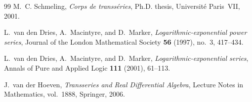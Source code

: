 \documentclass[11pt,openany]{book}
\theoremstyle{definition}
\theoremstyle{plain}
\theoremstyle{remark}
\begin{document}
\begin{thebibliography}{99}
M.~C. Schmeling,
\emph{Corps de transs\'eries},
Ph.D. thesis, Universit\'e Paris~VII, 2001.

L.~van den Dries, A.~Macintyre, and D.~Marker,
\emph{Logarithmic-exponential power series},
Journal of the London Mathematical Society \textbf{56} (1997), no.~3,
417--434.

L.~van den Dries, A.~Macintyre, and D.~Marker,
\emph{Logarithmic-exponential series},
Annals of Pure and Applied Logic \textbf{111} (2001), 61--113.

J.~van der Hoeven,
\emph{Transseries and Real Differential Algebra},
Lecture Notes in Mathematics, vol.~1888, Springer, 2006.

\end{thebibliography}

\printindex
\end{document}
